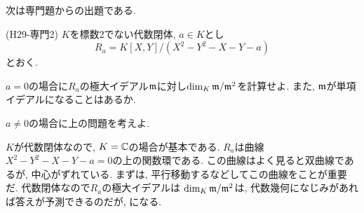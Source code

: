 次は専門題からの出題である.
\begin{egprob} (H29-専門2)
$K$を標数2でない代数閉体, $a\in K$とし
\[R_a = K[X,Y]/(X^2-Y^2-X-Y-a)\]
とおく.
\ben
\item $a=0$の場合に$R_a$の極大イデアル$\mathfrak{m}$に対し$\dim_{K}\mathfrak{m}/\mathfrak{m}^2$を計算せよ. また, $\mathfrak{m}$が単項イデアルになることはあるか.
\item $a\neq 0$の場合に上の問題を考えよ.
\een
\end{egprob}
\begin{screen}
$K$が代数閉体なので, $K=\mathbb{C}$の場合が基本である. $R_a$は曲線$X^2 - Y^2 - X - Y - a = 0$の上の関数環である. この曲線はよく見ると双曲線であるが, 中心がずれている. まずは, 平行移動するなどしてこの曲線をことが重要だ. 代数閉体なので$R_a$の極大イデアルは  $\dim_{K}\mathfrak{m}/\mathfrak{m}^2$は, 代数幾何になじみがあれば答えが予測できるのだが, になる.
\end{screen}

